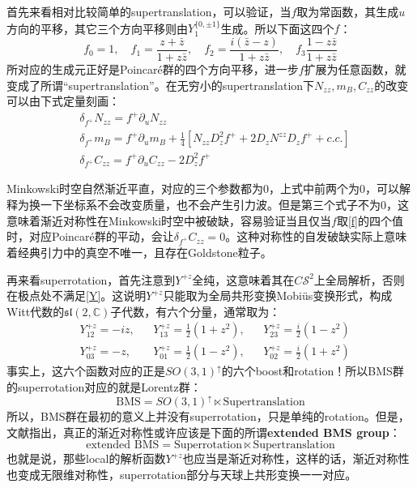 首先来看相对比较简单的supertranslation，可以验证，当$f$取为常函数，其生成$u$方向的平移，其它三个方向平移则由$Y_1^{\{0,\pm1\}}$生成。所以下面这四个$f$：
\begin{equation}\label{f}
	f_0=1,\quad f_1=\frac{z+\bar z}{1+z\bar z},\quad f_2=\frac{i\left(\bar z-z\right)}{1+z\bar z},\quad f_3\frac{1-z\bar z}{1+z\bar z}
\end{equation}
所对应的生成元正好是Poincar\'e群的四个方向平移，进一步$f$扩展为任意函数，就变成了所谓“supertranslation”。在无穷小的supertranslation下$N_{zz},m_B,C_{zz}$的改变可以由下式定量刻画：
\begin{equation}
	\begin{aligned}
		&\delta_{f^+}N_{zz}=f^+\partial_u N_{zz}\\
		&\delta_{f^+} m_B=f^+\partial_u m_B+\frac{1}{4}\left[N_{zz}D_z^2f^++2D_zN^{zz}D_zf^++c.c.\right]\\
		&\delta_{f^+} C_{zz}=f^+\partial_u C_{zz}-2D_z^2f^+
	\end{aligned}
\end{equation}

Minkowski时空自然渐近平直，对应的三个参数都为0，上式中前两个为0，可以解释为换一下坐标系不会改变质量，也不会产生引力波。但是第三个式子不为0，这意味着渐近对称性在Minkowski时空中被破缺，容易验证当且仅当$f$取\ref{f}的四个值时，对应Poincar\'e群的平动，会让$\delta_{f^+} C_{zz}=0$。这种对称性的自发破缺实际上意味着经典引力中的真空不唯一，且存在Goldstone粒子\cite{Strominger:2017zoo}。

再来看superrotation，首先注意到$Y^{+z}$全纯，这意味着其在$C\mathcal{S}^2$上全局解析，否则在极点处不满足\ref{Y}。这说明$Y^{+z}$只能取为全局共形变换Mobi\"us变换形式，构成Witt代数的$\mathfrak{sl}(2,\mathbb{C})$子代数，有六个分量，通常取为：
\begin{align*}
	&Y^{+z}_{12}=-iz,&&Y^{+z}_{13}=\frac{1}{2}(1+z^2),&&Y^{+z}_{23}=\frac{i}{2}(1-z^2)\\
	&Y^{+z}_{03}=-z,&&Y^{+z}_{01}=\frac{1}{2}(1-z^2),&&Y^{+z}_{02}=\frac{i}{2}(1+z^2)
\end{align*}
事实上，这六个函数对应的正是$SO(3,1)^\uparrow$的六个boost和rotation！所以BMS群的superrotation对应的就是Lorentz群：
\begin{equation}
	\text{BMS}=SO(3,1)^\uparrow\ltimes\text{Supertranslation} 
\end{equation}
所以，BMS群在最初的意义上并没有superrotation，只是单纯的rotation。但是，文献\cite{Barnich:2009se,Barnich:2010ojg,Barnich:2011mi,Banks:2003vp}指出，真正的渐近对称性或许应该是下面的所谓\textbf{extended BMS group}：
\begin{equation}
	\text{extended BMS} =\text{Superrotation}\ltimes\text{Supertranslation}
\end{equation}
也就是说，那些local的解析函数$Y^{+z}$也应当是渐近对称性，这样的话，渐近对称性也变成无限维对称性，superrotation部分与天球上共形变换一一对应。

